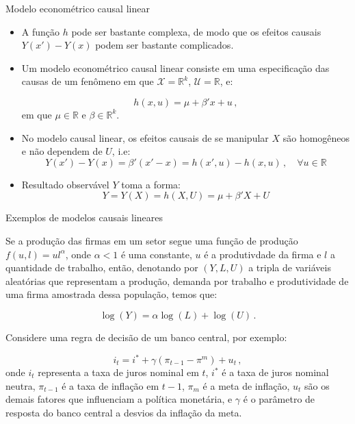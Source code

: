 \documentclass[11pt]{beamer}
\begin{document}
\begin{frame}{Modelo econométrico causal linear}
\begin{itemize}
	\item A função $h$ pode ser bastante complexa, de modo que os efeitos causais $Y(x')  - Y(x)$ podem ser bastante complicados.
	\item Um modelo econométrico causal linear consiste em uma especificação das causas de um fenômeno em que $\mathcal{X} = \mathbb{R}^k$, $\mathcal{U} = \mathbb{R}$, e:
	
	$$h(x,u) = \mu+ \beta'x + u\, ,$$
	em que $\mu \in \mathbb{R}$ e $\beta \in \mathbb{R}^k$.
	\item No modelo causal linear, os efeitos causais de se manipular $X$ são homogêneos e não dependem de $U$, i.e:
	$$Y(x')-Y(x) = \beta'(x'-x) = h(x',u) -h(x,u)\,,\quad \forall u \in \mathbb{R}$$
	\item Resultado observável $Y$ toma a forma:
	$$Y = Y(X) = h(X,U) = \mu + \beta'X + U$$
	
\end{itemize}

\end{frame}
\begin{frame}{Exemplos de modelos causais lineares}
		\begin{example}
	Se a produção das firmas em um setor  segue uma função de produção $f(u,l) = ul^\alpha$, onde $\alpha< 1$ é uma constante, $u$ é a produtivdade da firma e $l$ a quantidade de trabalho, então, denotando por $(Y,L,U)$ a tripla de variáveis aleatórias que representam a produção, demanda por trabalho e produtividade de uma firma amostrada dessa população, temos que:
	
	$$\log(Y) = \alpha \log(L) + \log(U)\, .$$
	\end{example}
	
	\begin{example}
	Considere uma regra de decisão de um banco central, por exemplo:
		
		$$i_t = i^* + \gamma (\pi_{t-1} - \pi^m)  + u_t\, ,$$
		onde $i_t$ representa a taxa de juros nominal em $t$, $i^*$ é a taxa de juros nominal neutra, $\pi_{t-1}$ é a taxa de inflação em $t-1$, $\pi_m$ é a meta de inflação, $u_t$ são os demais fatores que influenciam a política monetária, e $\gamma$ é o parâmetro de resposta do banco central a desvios da inflação da meta.
	\end{example}
\end{frame}
\end{document}
